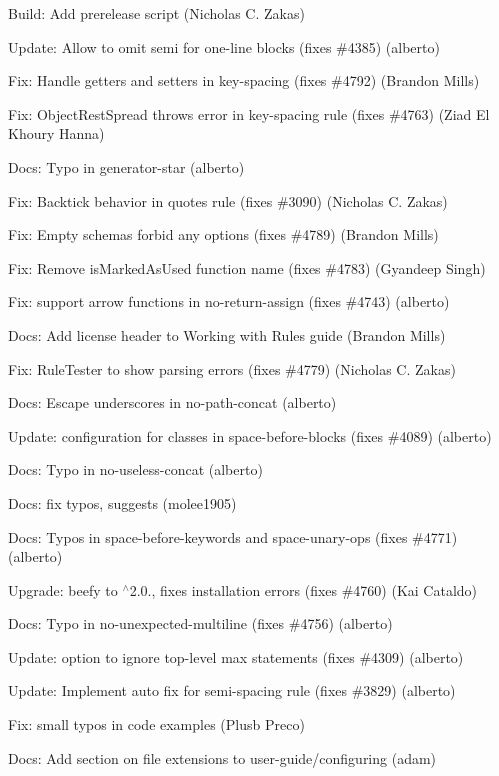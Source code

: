 \begin{DoxyItemize}
\item Build\+: Add prerelease script (Nicholas C. Zakas)
\item Update\+: Allow to omit semi for one-\/line blocks (fixes \#4385) (alberto)
\item Fix\+: Handle getters and setters in key-\/spacing (fixes \#4792) (Brandon Mills)
\item Fix\+: Object\+Rest\+Spread throws error in key-\/spacing rule (fixes \#4763) (Ziad El Khoury Hanna)
\item Docs\+: Typo in generator-\/star (alberto)
\item Fix\+: Backtick behavior in quotes rule (fixes \#3090) (Nicholas C. Zakas)
\item Fix\+: Empty schemas forbid any options (fixes \#4789) (Brandon Mills)
\item Fix\+: Remove {\ttfamily is\+Marked\+As\+Used} function name (fixes \#4783) (Gyandeep Singh)
\item Fix\+: support arrow functions in no-\/return-\/assign (fixes \#4743) (alberto)
\item Docs\+: Add license header to Working with Rules guide (Brandon Mills)
\item Fix\+: Rule\+Tester to show parsing errors (fixes \#4779) (Nicholas C. Zakas)
\item Docs\+: Escape underscores in no-\/path-\/concat (alberto)
\item Update\+: configuration for classes in space-\/before-\/blocks (fixes \#4089) (alberto)
\item Docs\+: Typo in no-\/useless-\/concat (alberto)
\item Docs\+: fix typos, suggests (molee1905)
\item Docs\+: Typos in space-\/before-\/keywords and space-\/unary-\/ops (fixes \#4771) (alberto)
\item Upgrade\+: beefy to $^\wedge$2.0., fixes installation errors (fixes \#4760) (Kai Cataldo)
\item Docs\+: Typo in no-\/unexpected-\/multiline (fixes \#4756) (alberto)
\item Update\+: option to ignore top-\/level max statements (fixes \#4309) (alberto)
\item Update\+: Implement auto fix for semi-\/spacing rule (fixes \#3829) (alberto)
\item Fix\+: small typos in code examples (Plusb Preco)
\item Docs\+: Add section on file extensions to user-\/guide/configuring (adam)

\end{DoxyItemize}
